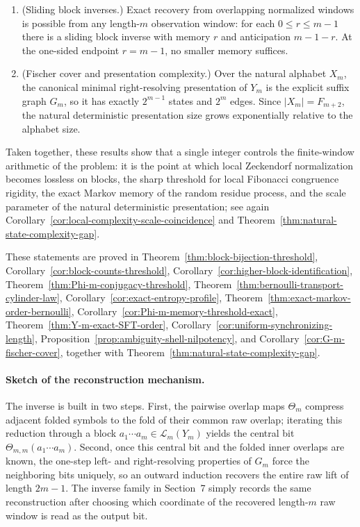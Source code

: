 \begin{theorem}
\begin{enumerate}[label=\textup{(\roman*)}]
Bernoulli$(p)$ input is itself an exact $m$-step Markov process.
\item\label{item:main-inverse}
\textup{(Sliding block inverses.)}
Exact recovery from overlapping normalized windows is possible from any
length-$m$ observation window: for each $0\le r\le m-1$ there is a sliding
block inverse with memory $r$ and anticipation $m-1-r$.  At the one-sided
endpoint $r=m-1$, no smaller memory suffices.
\item\label{item:main-fischer}
\textup{(Fischer cover and presentation complexity.)}
Over the natural alphabet $X_m$, the canonical minimal right-resolving
presentation of $Y_m$ is the explicit suffix graph $G_m$, so it has exactly
$2^{m-1}$ states and $2^m$ edges.  Since $\lvert X_m\rvert=F_{m+2}$, the
natural deterministic presentation size grows exponentially relative to the
alphabet size.
\end{enumerate}
\end{theorem}

Taken together, these results show that a single integer controls the
finite-window arithmetic of the problem: it is the point at which local
Zeckendorf normalization becomes lossless on blocks, the sharp threshold for
local Fibonacci congruence rigidity, the exact Markov memory of the random
residue process, and the scale parameter of the natural deterministic
presentation; see again
Corollary~\ref{cor:local-complexity-scale-coincidence} and
Theorem~\ref{thm:natural-state-complexity-gap}.

These statements are proved in
Theorem~\ref{thm:block-bijection-threshold},
Corollary~\ref{cor:block-counts-threshold},
Corollary~\ref{cor:higher-block-identification},
Theorem~\ref{thm:Phi-m-conjugacy-threshold},
Theorem~\ref{thm:bernoulli-transport-cylinder-law},
Corollary~\ref{cor:exact-entropy-profile},
Theorem~\ref{thm:exact-markov-order-bernoulli},
Corollary~\ref{cor:Phi-m-memory-threshold-exact},
Theorem~\ref{thm:Y-m-exact-SFT-order},
Corollary~\ref{cor:uniform-synchronizing-length},
Proposition~\ref{prop:ambiguity-shell-nilpotency}, and
Corollary~\ref{cor:G-m-fischer-cover}, together with
Theorem~\ref{thm:natural-state-complexity-gap}.

\paragraph{Sketch of the reconstruction mechanism.}
The inverse is built in two steps.  First, the pairwise overlap maps
$\Theta_m$ compress adjacent folded symbols to the fold of their common raw
overlap; iterating this reduction through a block
$a_1\cdots a_m\in\mathcal L_m(Y_m)$ yields the central bit
$\Theta_{m,m}(a_1\cdots a_m)$.  Second, once this central bit and the folded
inner overlaps are known, the one-step left- and right-resolving properties of
$G_m$ force the neighboring bits uniquely, so an outward induction recovers the
entire raw lift of length $2m-1$.  The inverse family in Section~7 simply
records the same reconstruction after choosing which coordinate of the
recovered length-$m$ raw window is read as the output bit.

